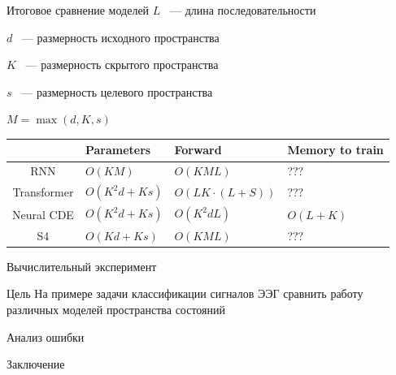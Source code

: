 \documentclass[10pt,pdf,hyperref={unicode}]{beamer}
\begin{document}
\begin{frame}{Итоговое сравнение моделей}
	$L$ ~--- длина последовательности
	
	$d$ ~--- размерность исходного пространства
	
	$K$ ~--- размерность скрытого пространства
	
	$s$ ~--- размерность целевого пространства
	
	$M = \max(d, K, s)$  
	
	\begin{table}
		\begin{tabular}{c|l|l|l|}
			\cline{2-4}
			\multicolumn{1}{l|}{}             & Parameters & Forward & Memory to train \\ \hline
			\multicolumn{1}{|c|}{RNN}         & $O(KM)$ & $O(KML)$ & ??? \\ \hline
			\multicolumn{1}{|c|}{Transformer} & $O(K^2d + Ks)$ & $O(LK \cdot (L+S))$ & ??? \\ \hline
			\multicolumn{1}{|c|}{Neural CDE}  & $O(K^2d + Ks)$ & $O(K^2dL)$ & $O(L + K)$ \\ \hline
			\multicolumn{1}{|c|}{S4}          & $O(Kd + Ks)$ & $O(KML)$ & ??? \\ \hline
		\end{tabular}
	\end{table}
\end{frame}
\begin{frame}{Вычислительный эксперимент}
	\begin{alertblock}{Цель}
		 На примере задачи классификации сигналов ЭЭГ сравнить работу различных моделей пространства состояний
	\end{alertblock}
	
\end{frame}

\begin{frame}{Анализ ошибки}
	
\end{frame}

\begin{frame}{Заключение}
	
\end{frame}
\end{document}
